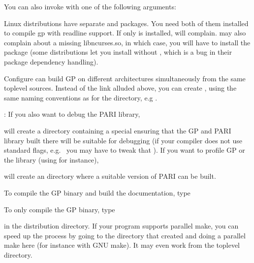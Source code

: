 You can also invoke  with one of the following arguments:




 Linux distributions have separate  and
 packages. You need both of them installed to compile gp
with readline support. If only  is installed, 
will complain.  may also complain about a missing
libncurses.so, in which case, you will have to install the
 package (some distributions let you install
 without , which is a bug in their
package dependency handling).

 Configure can build GP on different architectures
simultaneously from the same toplevel sources. Instead of the 
link alluded above, you can create ,
using the same naming conventions as for the  directory,
e.g .

: If you also want to debug the PARI library,


\noindent will create a directory  containing a special
 ensuring that the GP and PARI library built there will be
suitable for debugging (if your compiler does not use standard flags,
e.g.~ you may have to tweak that ). If you want to
profile GP or the library (using  for instance), 


\noindent will create an  directory where a suitable version
of PARI can be built.

 To compile the GP binary and build the
documentation, type


\noindent To only compile the GP binary, type


\noindent in the distribution directory. If your  program supports
parallel make, you can speed up the process by going to the 
directory that  created and doing a parallel make here (for
instance  with GNU make). It may even work from the toplevel
directory.

